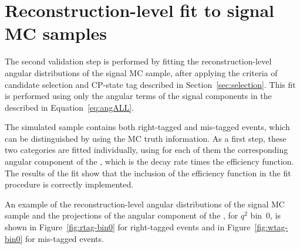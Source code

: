 




\section{Reconstruction-level fit to signal MC samples}
\label{sec:fitval-reco}

The second validation step is performed by fitting the reconstruction-level angular distributions of the signal MC sample, after applying the criteria of candidate selection and CP-state tag described in Section~\ref{sec:selection}.
This fit is performed using only the angular terms of the signal components in the \pdf described in Equation~\ref{eq:angALL}.

The simulated sample contains both right-tagged and mis-tagged events, which can be distinguished by using the MC truth information.
As a first step, these two categories are fitted individually, using for each of them the corresponding angular component of the \pdf, which is the decay rate times the efficiency function.
The results of the fit show that the inclusion of the efficiency function in the fit procedure is correctly implemented.

An example of the reconstruction-level angular distributions of the signal MC sample and the projections of the angular component of the \pdf, for $q^2$ bin~0, is shown in Figure~\ref{fig:rtag-bin0} for right-tagged events and in Figure~\ref{fig:wtag-bin0} for mis-tagged events.

